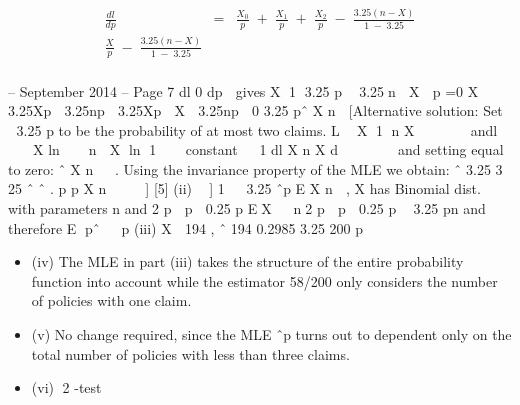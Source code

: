 \documentclass[a4paper,12pt]{article}
\begin{document}
\begin{eqnarray*}
\frac{dl}{dp} &=& \frac{X_0}{p} \;+\; \frac{X_1}{p} \;+\; \frac{X_2}{p} \;-\; \frac{3.25(n-X)}{1 \;-\;3.25}\\
\frac{X}{p} \;-\; \frac{3.25(n-X)}{1 \;-\;3.25}\\
\end{eqnarray*}

 – September 2014 – %
Page 7
dl 0
dp
 gives X 1 3.25 p  3.25n  X  p =0
X  3.25Xp  3.25np  3.25Xp  X  3.25np  0
3.25
pˆ X
n

[Alternative solution:
   Set   3.25 p to be the probability of at most two claims.
 L  X 1 n X       andl   X ln  n  X ln 1   constant
  
 1
 dl X n X
 d
 
  
   
 and setting equal to zero: ˆ X
 n
   .
 Using the invariance property of the MLE we obtain:
   ˆ 3.25
 3 25
 ˆ ˆ
 .
 p p X
 n
     ] [5]
(ii) 􀜧􁈾 ] 1  
3.25
ˆp E X
n
 , X has Binomial dist. with parameters n and
2 p  p  0.25 p
EX   n2 p  p  0.25 p  3.25 pn
and therefore E pˆ   p 
(iii) X  194 , ˆ 194 0.2985
3.25 200
p 


\begin{itemize}
\item (iv) The MLE in part (iii) takes the structure of the entire probability function into
account while the estimator 58/200 only considers the number of policies with
one claim. 
\item (v) No change required, since the MLE ˆp turns out to dependent only on the total
number of policies with less than three claims. 
\item (vi) 2 -test 
\end{itemize}
\end{document}
